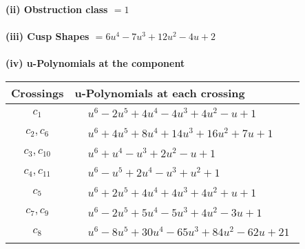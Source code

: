 \documentclass[1p]{elsarticle_modified}
\theoremstyle{definition}
\begin{document}
\flushleft \textbf{(ii) Obstruction class $= 1$}\\~\\
\flushleft \textbf{(iii) Cusp Shapes $= 6 u^4-7 u^3+12 u^2-4 u+2$}\\~\\
\newpage\renewcommand{\arraystretch}{1}
\flushleft \textbf{(iv) u-Polynomials at the component}\newline \\
\begin{tabular}{m{50pt}|m{274pt}}
Crossings & \hspace{64pt}u-Polynomials at each crossing \\
\hline $$\begin{aligned}c_{1}\end{aligned}$$&$\begin{aligned}
&u^6-2 u^5+4 u^4-4 u^3+4 u^2- u+1
\end{aligned}$\\
\hline $$\begin{aligned}c_{2},c_{6}\end{aligned}$$&$\begin{aligned}
&u^6+4 u^5+8 u^4+14 u^3+16 u^2+7 u+1
\end{aligned}$\\
\hline $$\begin{aligned}c_{3},c_{10}\end{aligned}$$&$\begin{aligned}
&u^6+u^4- u^3+2 u^2- u+1
\end{aligned}$\\
\hline $$\begin{aligned}c_{4},c_{11}\end{aligned}$$&$\begin{aligned}
&u^6- u^5+2 u^4- u^3+u^2+1
\end{aligned}$\\
\hline $$\begin{aligned}c_{5}\end{aligned}$$&$\begin{aligned}
&u^6+2 u^5+4 u^4+4 u^3+4 u^2+u+1
\end{aligned}$\\
\hline $$\begin{aligned}c_{7},c_{9}\end{aligned}$$&$\begin{aligned}
&u^6-2 u^5+5 u^4-5 u^3+4 u^2-3 u+1
\end{aligned}$\\
\hline $$\begin{aligned}c_{8}\end{aligned}$$&$\begin{aligned}
&u^6-8 u^5+30 u^4-65 u^3+84 u^2-62 u+21
\end{aligned}$\\
\hline
\end{tabular}\\~\\
\end{document}
